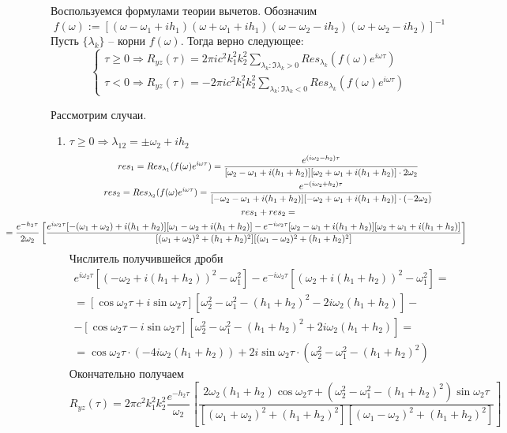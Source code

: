 \documentclass[a4paper,12pt]{article}
\begin{document}
Воспользуемся формулами теории вычетов.
Обозначим
\[f(\omega):=\left[(\omega-\omega_1+ih_1)(\omega+\omega_1+ih_1)(\omega-\omega_2-ih_2)(\omega+\omega_2-ih_2)\right]^{-1}\]
Пусть $\{\lambda_k\}$ -- корни $f(\omega)$.
Тогда верно следующее:
\[\begin{cases}
    \tau \ge 0 \Rightarrow R_{yz}(\tau) = 2\pi i c^2 k_1^2 k_2^2 \sum_{\lambda_k : \Im \lambda_k > 0} Res_{\lambda_k}(f(\omega) e^{i\omega \tau}) \\
    \tau < 0 \Rightarrow R_{yz}(\tau) = -2\pi i c^2 k_1^2 k_2^2 \sum_{\lambda_k : \Im \lambda_k < 0} Res_{\lambda_k}(f(\omega) e^{i\omega \tau})
\end{cases}\]

Рассмотрим случаи.
\begin{enumerate}
    \item $\tau \ge 0  \Rightarrow \lambda_{12} = \pm \omega_2 + ih_2$
    \begin{gather*}
        res_1 = Res_{\lambda_1}(f(\omega) e^{i\omega \tau}) = \frac{e^{(i\omega_2-h_2)\tau}}{[\omega_2-\omega_1+i(h_1+h_2)][\omega_2+\omega_1+i(h_1+h_2)] \cdot 2\omega_2} \\
        res_2 = Res_{\lambda_2}(f(\omega) e^{i\omega \tau}) = \frac{e^{-(i\omega_2+h_2)\tau}}{[-\omega_2-\omega_1+i(h_1+h_2)][-\omega_2+\omega_1+i(h_1+h_2)] \cdot (-2\omega_2)} \\
        res_1+res_2 = \\
        \hspace{-2.5cm}
        = \frac{e^{-h_2\tau}}{2\omega_2} \left[ \frac{e^{i\omega_2\tau} [-(\omega_1+\omega_2)+i(h_1+h_2)][\omega_1-\omega_2+i(h_1+h_2)]-e^{-i\omega_2\tau}[\omega_2-\omega_1+i(h_1+h_2)][\omega_2+\omega_1+i(h_1+h_2)] }{ [(\omega_1+\omega_2)^2+(h_1+h_2)^2][(\omega_1-\omega_2)^2+(h_1+h_2)^2] } \right]
    \end{gather*}
    Числитель получившейся дроби
    \begin{gather*}
        e^{i\omega_2\tau}[(-\omega_2+i(h_1+h_2))^2-\omega_1^2]-e^{-i\omega_2\tau}[(\omega_2+i(h_1+h_2))^2-\omega_1^2] = \\
        = [\cos \omega_2\tau + i \sin \omega_2\tau][\omega_2^2-\omega_1^2-(h_1+h_2)^2-2i\omega_2(h_1+h_2)]- \\
        - [\cos \omega_2\tau - i \sin \omega_2\tau][\omega_2^2-\omega_1^2-(h_1+h_2)^2+2i\omega_2(h_1+h_2)] = \\
        = \cos \omega_2\tau \cdot (-4i\omega_2(h_1+h_2)) + 2i \sin \omega_2\tau \cdot (\omega_2^2-\omega_1^2-(h_1+h_2)^2)
    \end{gather*}
    Окончательно получаем
    \[ \boxed{ R_{yz}(\tau) = 2\pi c^2 k_1^2 k_2^2 \frac{e^{-h_2\tau}}{\omega_2} \left[ \frac{ 2\omega_2(h_1+h_2) \cos \omega_2\tau + (\omega_2^2-\omega_1^2-(h_1+h_2)^2) \sin \omega_2\tau}{ [(\omega_1+\omega_2)^2+(h_1+h_2)^2][(\omega_1-\omega_2)^2+(h_1+h_2)^2] } \right] } \]


\end{enumerate}
\end{document}
